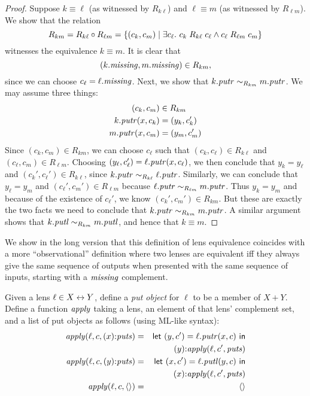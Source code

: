 \begin{defn}[$R$-similarity]
\begin{proof}
Suppose $k \equiv \ell$ (as witnessed by $R_{k\ell}$) and
$\ell \equiv m$ (as witnessed by $R_{\ell m}$). We show that the
relation
\[R_{km} = R_{k\ell}\circ R_{\ell m} = \{(c_k,c_m) \mid \exists c_\ell.\ c_k \mathrel{R_{k\ell}} c_\ell
\land c_\ell \mathrel{R_{\ell m}} c_m\}\]
witnesses the equivalence $k \equiv m$. It is clear that
\[(k.\mathit{missing},m.\mathit{missing}) \in R_{km},\]
since we can choose $c_\ell = \ell.\mathit{missing}$. Next, we show that $k.\mathit{putr}
\sim_{R_{km}} m.\mathit{putr}$. We may assume three things:
\begin{align*}
    (c_k,c_m) &\in R_{km} \\
    k.\mathit{putr}(x,c_k) &= (y_k, c_k') \\
    m.\mathit{putr}(x,c_m) &= (y_m, c_m')
\end{align*}
Since $(c_k,c_m) \in R_{km}$, we can choose $c_\ell$ such that $(c_k,c_\ell)
\in R_{k\ell}$ and $(c_\ell,c_m) \in R_{\ell m}$. Choosing
$(y_\ell,c_\ell')=\ell.\mathit{putr}(x,c_\ell)$, we then conclude that $y_k=y_\ell$
and $(c_k',c_\ell') \in R_{k\ell}$, since $k.\mathit{putr} \sim_{R_{k\ell}}
\ell.\mathit{putr}$. Similarly, we can conclude that $y_\ell=y_m$ and
$(c_\ell',c_m') \in R_{\ell m}$ because $\ell.\mathit{putr} \sim_{R_{\ell m}}
m.\mathit{putr}$. Thus $y_k=y_m$ and because of the
existence of $c_\ell'$, we know $(c_k',c_m') \in R_{km}$. But these are
exactly the two facts we need to conclude that $k.\mathit{putr} \sim_{R_{km}}
m.\mathit{putr}$. A similar argument shows that $k.\mathit{putl} \sim_{R_{km}} m.\mathit{putl}$, and
hence that $k \equiv m$.
\end{proof}
\fi

\iffull\else We show in the long version that this definition of lens
equivalence coincides with a more ``observational'' definition where two
lenses are equivalent iff they always give the same sequence of outputs when
presented with the same sequence of inputs, starting with a $\mathit{missing}$
complement.  

\fi

\iffull
\begin{defn}
Given a lens $\ell \in X \leftrightarrow Y$, define a \emph{put object} for $\ell$ to
be a member of $X + Y$. Define a function $\mathit{apply}$ taking a lens, an element
of that lens' complement set, and a list of put objects as follows\iftext{}
(using ML-like syntax)\fi:
\begin{eqnarray*}
\mathit{apply}(\ell,c,( x) \mathord{:} \mathit{puts}) &=& \mathsf{let}\  (y,c') = \ell.\mathit{putr}(x,c) \ \mathsf{in} \\
&& ( y) \mathord{:} \mathit{apply}(\ell,c',\mathit{puts}) \\
\mathit{apply}(\ell,c,( y) \mathord{:} \mathit{puts}) &=& \mathsf{let}\  (x,c') = \ell.\mathit{putl}(y,c) \ \mathsf{in} \\
&& ( x) \mathord{:} \mathit{apply}(\ell,c',\mathit{puts}) \\
\mathit{apply}(\ell,c,\left<\right>) &=&  \left<\right>
\end{eqnarray*}
\end{defn}


\end{defn}
